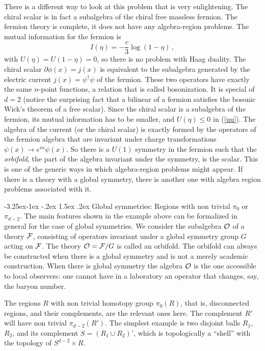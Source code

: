\documentclass[11pt,a4paper]{article}
\makeatletter
\renewcommand\subsection{\@startsection{subsection}{2}{\z@}%
                                   {-3.25ex\@plus -1ex \@minus -.2ex}%
                                     {1.5ex \@plus .2ex}%
                                     {\normalfont\bfseries}}
\numberwithin{equation}{section}
\newcommand{\be}{\begin{equation}}
\newcommand{\ee}{\end{equation}}
\makeatother
\begin{document}
There is a different way to look at this problem that is very enlightening. The chiral scalar is in fact a subalgebra of the chiral free massless fermion. The fermion theory is complete, it does not have any algebra-region problems. The mutual information for the fermion is
\be
I(\eta)=-\frac{c}{3} \log(1-\eta)\,,
\ee
with $U(\eta)=U(1-\eta)=0$, so there is no problem with Haag duality. 
The chiral scalar $\partial \phi(x)=j(x)$ is equivalent to the subalgebra generated by the electric current $j(x)=\psi^\dagger\psi$ of the fermion. These two operators have exactly the same $n$-point functions, a relation that is called bosonization. It is special of $d=2$ (notice the surprising fact that a bilinear of a fermion satisfies the bosonic Wick's theorem of a free scalar). Since the chiral scalar is a subalgebra of the fermion, its mutual information has to be smaller, and $U(\eta)\le 0$ in (\ref{uu}).
 The algebra of the current (or the chiral scalar) is exactly formed by the operators of the fermion algebra that are invariant under charge transformations $\psi(x)\rightarrow e^{i\alpha} \psi(x)$. So there is a $U(1)$ symmetry in the fermion such that the {\sl orbifold}, the part of the algebra invariant under the symmetry, is the scalar. This is one of the generic ways in which algebra-region problems might appear. If there is a theory with a global symmetry, there is another one with algebra region problems associated with it.   



\subsection{Global symmetries: Regions with non trivial $\pi_0$ or $\pi_{d-2}$.}
\label{global}
The main features shown in the example above can be formalized in general for the case of global symmetries. 
We consider the subalgebra ${\cal O}$ of a theory ${\cal F}$, consisting of operators invariant under a global symmetry group $G$ acting on ${\cal F}$. The theory ${\cal O}={\cal F}/G$ is called an orbifold. The orbifold can always be constructed when there is a global symmetry and is not a merely academic construction. When there is global symmetry the algebra ${\cal O}$ is the one accessible to local observers: one cannot have in a laboratory an operator that changes, say, the baryon number.     

The regions $R$ with non trivial homotopy group $\pi_0(R)$, that is, disconnected regions, and their complements,  are the relevant ones here. The complement $R'$ will have non trivial $\pi_{d-2}(R')$.  The simplest example is two disjoint balls $R_1$, $R_2$, and its complement $S=(R_1\cup R_2)'$, which is topologically a ``shell'' with the topology of $S^{d-2}\times R$. 
\end{document}
